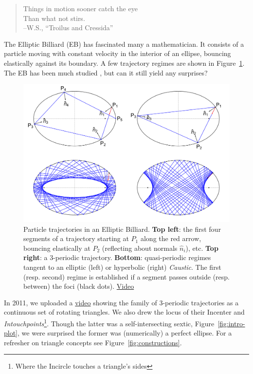 \begin{quote}
Things in motion sooner catch the eye\\
Than what not stirs.\\
--W.S., ``Troilus and Cressida'' 
\end{quote}

The Elliptic Billiard (EB) has fascinated many a mathematician. It consists of a particle moving with constant velocity in the interior of an ellipse, bouncing elastically against its boundary. A few trajectory regimes are shown in Figure~\ref{fig:billiard-trajectories}. The EB has been much studied \cite{dragovic11,sergei91}, but can it still yield any surprises?

\begin{figure}
    \centering
    \includegraphics[width=\textwidth]{pics/u1000_billiard_trajectories.pdf}
    \caption{Particle trajectories in an Elliptic Billiard. \textbf{Top left}: the first four segments of a trajectory starting at $P_1$ along the red arrow, bouncing elastically at $P_2$ (reflecting about normals $\hat{n}_i$), etc. \textbf{Top right}: a 3-periodic trajectory. \textbf{Bottom}: quasi-periodic regimes tangent to an elliptic (left) or hyperbolic (right) {\em Caustic}. The first (resp. second) regime is established if a segment passes outside (resp. between) the foci (black dots).
    \href{https://youtu.be/A7mPzrNJHkA}{Video} \cite[pl\#1]{dsr_math_intell_playlist}}
    \label{fig:billiard-trajectories}
\end{figure}

In 2011, we uploaded a
\href{https://www.youtube.com/watch?v=9xU6T7hQMzs}{video} \cite[pl\#2]{dsr_math_intell_playlist} showing the family of 3-periodic trajectories as a continuous set of rotating triangles. We also drew the locus of their Incenter and {\em Intouchpoints}\footnote{Where the Incircle touches a triangle's sides}. Though the latter was a self-intersecting sextic, Figure~\ref{fig:intro-plot}, we were surprised the former was (numerically) a perfect ellipse. For a refresher on triangle concepts see Figure~\ref{fig:constructions}. 


